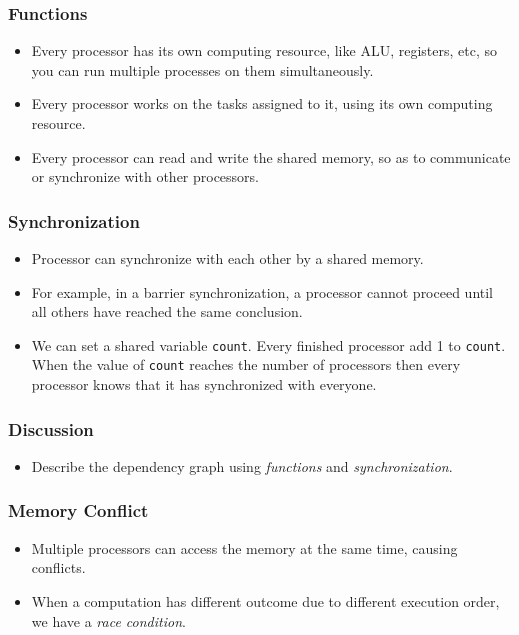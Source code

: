 \documentclass{beamer}
\begin{document}
\begin{CJK}{UTF8}{bsmi}
\begin{frame}
\frametitle{Functions} 
\begin{itemize}
\item Every processor has its own computing resource, like ALU,
  registers, etc, so you can run multiple processes on them
  simultaneously.
\item Every processor works on the tasks assigned to it, using its own
  computing resource.
\item Every processor can read and write the shared memory, so as to
  communicate or synchronize with other processors.
\end{itemize}
\end{frame}

\begin{frame}
\frametitle{Synchronization}
\begin{itemize}
\item Processor can synchronize with each other by a shared memory.
\item For example, in a barrier synchronization, a processor cannot
  proceed until all others have reached the same conclusion.
\item We can set a shared variable {\tt count}.  Every finished
  processor add 1 to {\tt count}.  When the value of {\tt count}
  reaches the number of processors then every processor knows that it
  has synchronized with everyone.
\end{itemize}
\end{frame}

\begin{frame}
\frametitle{Discussion}
\begin{itemize}
\item Describe the dependency graph using {\em functions} and {\em
  synchronization}.
\end{itemize}
\end{frame}

\begin{frame}
\frametitle{Memory Conflict}
\begin{itemize}
\item Multiple processors can access the memory at the same time,
  causing conflicts.
\item When a computation has different outcome due to different
  execution order, we have a {\em race condition}.
\end{itemize}
\end{frame}


\end{CJK}
\end{document}
